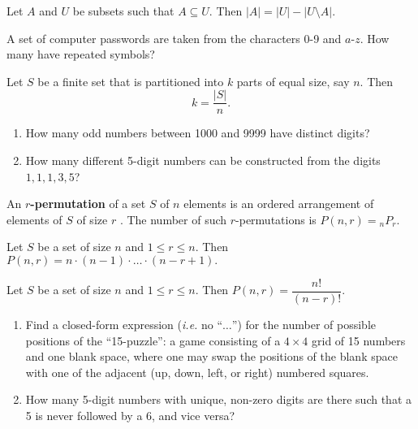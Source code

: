 \begin{theorem} Let $A$ and $U$ be subsets such that $A \subseteq U$.  Then $|A| = |U| - |U\setminus A|$.
\end{theorem}

\begin{example} A set of computer passwords are taken from the characters 0-9 and $a$-$z$. How many have repeated symbols?
\end{example}

\begin{theorem} Let $S$ be a finite set that is partitioned into $k$ parts of equal size, say $n$.  Then $$k = \frac{|S|}{n}.$$
\end{theorem}

\begin{examples}\leavevmode
\begin{enumerate}
    \item How many odd numbers between 1000 and 9999 have distinct digits?
    \item How many different 5-digit numbers can be constructed from the digits $1, 1, 1, 3, 5$?
\end{enumerate}
\end{examples}

\begin{definition} An \textbf{$r$-permutation} of a set $S$ of $n$ elements is an ordered arrangement of elements of $S$ of size $r$ .  The number of such $r$-permutations is $P(n, r) = {}_n P_r$.
\end{definition}

\begin{theorem} Let $S$ be a set of size $n$ and $1 \leq r \leq n$.  Then $P(n, r) = n \cdot (n-1) \cdot \ldots \cdot (n-r+1).$
\end{theorem}

\begin{corollary} Let $S$ be a set of size $n$ and $1 \leq r \leq n$.  Then $P(n, r) = \dfrac{n!}{(n-r)!}.$
\end{corollary}

\begin{exercises}\leavevmode
\begin{enumerate}
    \item Find a closed-form expression (\textit{i.e.} no ``$\ldots$'') for the number of possible positions of the ``15-puzzle'': a game consisting of a $4\times 4$ grid of 15 numbers and one blank space, where one may swap the positions of the blank space with one of the adjacent (up, down, left, or right) numbered squares.
    \item How many 5-digit numbers with unique, non-zero digits are there such that a 5 is never followed by a 6, and vice versa?
\end{enumerate}
\end{exercises}

